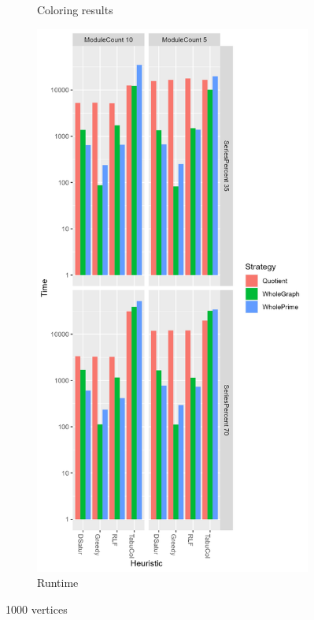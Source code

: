 \documentclass[a4paper]{article}
\begin{document}
\begin{figure}
\begin{subfigure}{.5\paperwidth}
      \caption{Coloring results}
      \label{fig:1000c}
    \end{subfigure}%
    \begin{subfigure}{.5\paperwidth}
        \includegraphics[width=\columnwidth]{Tables/1000Time.png}
      \caption{Runtime}
      \label{fig:1000t}
    \end{subfigure}
\caption{1000 vertices}
\label{fig:1000}
\end{figure}
\end{document}
